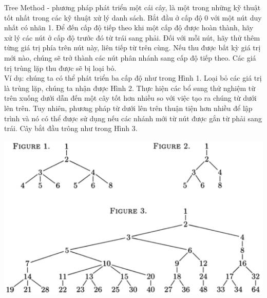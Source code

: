 \documentclass{article}
\begin{document}
\begin{multicols}{3}
  \qquad Tree Method - phương pháp phát triển một cái cây, là một trong những kỹ thuật tốt nhất 
  trong các kỹ thuật xử lý danh sách. Bắt đầu ở cấp độ 0 với một nút duy nhất có nhãn 1. Để đến 
  cấp độ tiếp theo khi một cấp độ được hoàn thành, hãy xử lý các nút ở cấp độ trước đó từ trái sang 
  phải. Đối với mỗi nút, hãy thử thêm từng giá trị phía trên nút này, liên tiếp từ trên cùng. Nếu thu
   được bất kỳ giá trị mới nào, chúng sẽ trở thành các nút phân nhánh sang cấp độ tiếp theo. Các 
   giá trị trùng lặp thu được sẽ bị loại bỏ.\\
  \indent \qquad Ví dụ: chúng ta có thể phát triển ba cấp độ như trong Hình 1. 
  Loại bỏ các giá trị là trùng lặp, chúng ta nhận được Hình 2. Thực hiện các bổ sung 
  thử nghiệm từ trên xuống dưới dẫn đến một cây tốt hơn nhiều so với việc tạo ra chúng 
  từ dưới lên trên. Tuy nhiên, phương pháp từ dưới lên trên thuận tiện hơn nhiều để lập 
  trình và nó có thể được sử dụng nếu các nhánh mới từ nút được gắn từ phải sang trái. Cây 
  bắt đầu trông như trong Hình 3.\\
  \begin{center}
    \includegraphics[width=.7\linewidth]{tree.png}\newline
  \end{center}

\noindent



\end{multicols}
\end{document}
